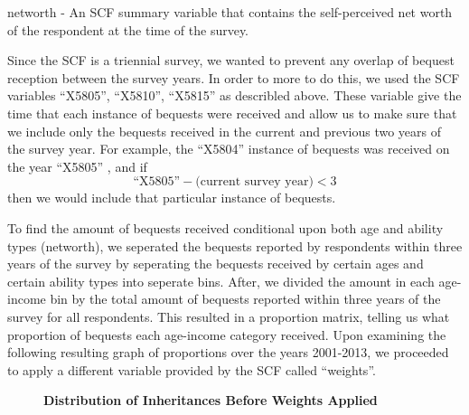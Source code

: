 \documentclass[letterpaper,12pt]{article}
\newcommand{\quotes}[1]{``#1''}
\theoremstyle{definition}
\begin{document}
\begin{spacing}{1.5}
networth - An SCF summary variable that contains the self-perceived net worth of the respondent at the time of the survey. 


Since the SCF is a triennial survey, we wanted to prevent any overlap of bequest reception between the survey years. In order to more to do this, we used the SCF variables \quotes{X5805}, \quotes{X5810}, \quotes{X5815} as describled above. These variable give the time that each instance of bequests were received and allow us to make sure that we include only the bequests received in the current and previous two years of the survey year. For example, the \quotes{X5804} instance of bequests was received on the year \quotes{X5805} , and if 
\[\text{\quotes{X5805}} - \text{(current~survey~year)} <3\]
 then we would include that particular instance of bequests.

 To find the amount of bequests received conditional upon both age and ability types (networth), we seperated the bequests reported by respondents within three years of the survey by seperating the bequests received by certain ages and certain ability types into seperate bins. After, we divided the amount in each age-income bin by the total amount of bequests reported within three years of the survey for all respondents. This resulted in a proportion matrix, telling us what proportion of bequests each age-income category received. Upon examining the following resulting graph of proportions over the years 2001-2013, we proceeded to apply a different variable provided by the SCF called \quotes{weights}.

\begin{figure}[htbp]\centering \captionsetup{width=5.5in}
    \caption{\label{Weightfig}\textbf{Distribution of Inheritances Before Weights Applied}}
  \end{figure}
\newpage


\end{spacing}
\end{document}
